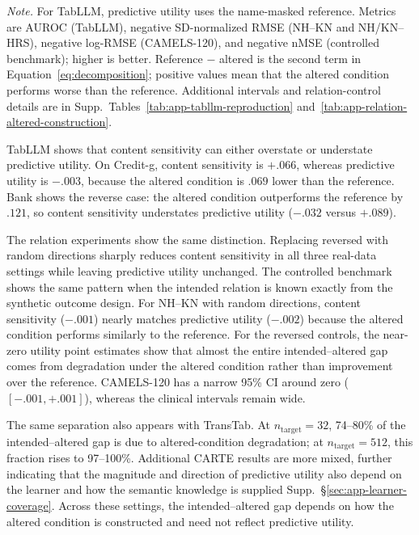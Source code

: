\documentclass{article} %
\newcommand{\supp}[1]{\textnormal{Supp.~#1}}
\begin{document}
\begin{table}[h]
\noindent
\begin{minipage}{\linewidth}
\fontsize{8pt}{9pt}\selectfont
\emph{Note.}
For TabLLM, predictive utility uses the name-masked reference.
Metrics are AUROC (TabLLM), negative SD-normalized RMSE (NH--KN and NH/KN--HRS), negative log-RMSE (CAMELS-120), and negative nMSE (controlled benchmark); higher is better.
Reference $-$ altered is the second term in Equation~\ref{eq:decomposition}; positive values mean that the altered condition performs worse than the reference.
Additional intervals and relation-control details are in \supp{Tables~\ref{tab:app-tabllm-reproduction} and~\ref{tab:app-relation-altered-construction}}.
\end{minipage}

\end{table}

TabLLM shows that content sensitivity can either overstate or understate predictive utility. 
On Credit-g, content sensitivity is $+.066$, whereas predictive utility is $-.003$, because the altered condition is $.069$ lower than the reference.
Bank shows the reverse case: the altered condition outperforms the reference by $.121$, so content sensitivity understates predictive utility ($-.032$ versus $+.089$).

The relation experiments show the same distinction.
Replacing reversed with random directions sharply reduces content sensitivity in all three real-data settings while leaving predictive utility unchanged.
The controlled benchmark shows the same pattern when the intended relation is known exactly from the synthetic outcome design.
For NH--KN with random directions, content sensitivity ($-.001$) nearly matches predictive utility ($-.002$) because the altered condition performs similarly to the reference.
For the reversed controls, the near-zero utility point estimates show that almost the entire intended--altered gap comes from degradation under the altered condition rather than improvement over the reference.
CAMELS-120 has a narrow 95\% CI around zero ($[-.001,+.001]$), whereas the clinical intervals remain wide.

The same separation also appears with TransTab. 
At $n_{\mathrm{target}}=32$, 74--80\% of the intended--altered gap is due to altered-condition degradation; at $n_{\mathrm{target}}=512$, this fraction rises to 97--100\%.
Additional CARTE results are more mixed, further indicating that the magnitude and direction of predictive utility also depend on the learner and how the semantic knowledge is supplied \supp{\S\ref{sec:app-learner-coverage}}.
Across these settings, the intended--altered gap depends on how the altered condition is constructed and need not reflect predictive utility.
\end{document}
